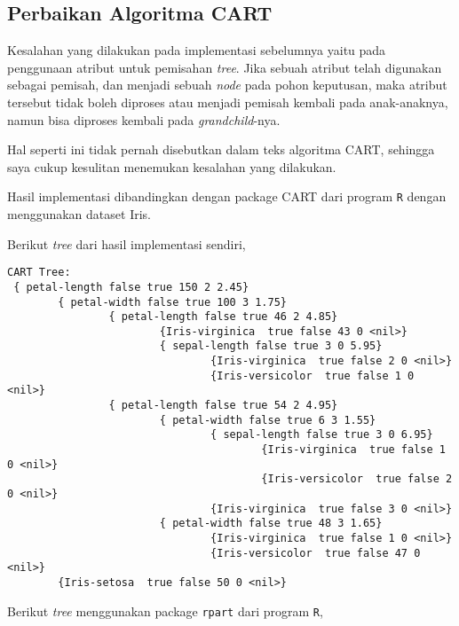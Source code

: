 \subsection{Perbaikan Algoritma CART}

Kesalahan yang dilakukan pada implementasi sebelumnya yaitu pada penggunaan
atribut untuk pemisahan \textit{tree}.
Jika sebuah atribut telah digunakan sebagai pemisah, dan menjadi sebuah
\textit{node} pada pohon keputusan, maka atribut tersebut tidak boleh diproses
atau menjadi pemisah kembali pada anak-anaknya, namun bisa diproses kembali
pada \textit{grandchild}-nya.

Hal seperti ini tidak pernah disebutkan dalam teks algoritma CART,
sehingga saya cukup kesulitan menemukan kesalahan yang dilakukan.

Hasil implementasi dibandingkan dengan package CART dari program \texttt{R}
dengan menggunakan dataset Iris.

Berikut \textit{tree} dari hasil implementasi sendiri,

\begin{lstlisting}
CART Tree:
 { petal-length false true 150 2 2.45}
        { petal-width false true 100 3 1.75}
                { petal-length false true 46 2 4.85}
                        {Iris-virginica  true false 43 0 <nil>}
                        { sepal-length false true 3 0 5.95}
                                {Iris-virginica  true false 2 0 <nil>}
                                {Iris-versicolor  true false 1 0 <nil>}
                { petal-length false true 54 2 4.95}
                        { petal-width false true 6 3 1.55}
                                { sepal-length false true 3 0 6.95}
                                        {Iris-virginica  true false 1 0 <nil>}
                                        {Iris-versicolor  true false 2 0 <nil>}
                                {Iris-virginica  true false 3 0 <nil>}
                        { petal-width false true 48 3 1.65}
                                {Iris-virginica  true false 1 0 <nil>}
                                {Iris-versicolor  true false 47 0 <nil>}
        {Iris-setosa  true false 50 0 <nil>}
\end{lstlisting}

Berikut \textit{tree} menggunakan package \texttt{rpart} dari program \texttt{R},

